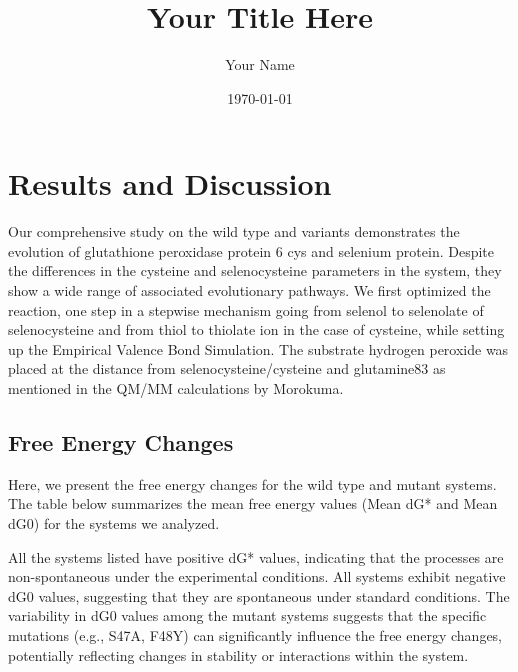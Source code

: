 \documentclass{article}
\begin{document}
\title{Your Title Here}
\author{Your Name}
\date{\today}
\maketitle

\section{Results and Discussion}

Our comprehensive study on the wild type and variants demonstrates the evolution of glutathione peroxidase protein 6 cys and selenium protein. 
Despite the differences in the cysteine and selenocysteine parameters in the system, they show a wide range of associated evolutionary pathways.
We first optimized the reaction, one step in a stepwise mechanism going from selenol to selenolate of selenocysteine and from thiol to thiolate ion in the case of cysteine, while setting up the Empirical Valence Bond Simulation.
The substrate hydrogen peroxide was placed at the distance from selenocysteine/cysteine and glutamine83 as mentioned in the QM/MM calculations by Morokuma.

\subsection{Free Energy Changes}

Here, we present the free energy changes for the wild type and mutant systems. The table below summarizes the mean free energy values (Mean dG* and Mean dG0) for the systems we analyzed.

All the systems listed have positive dG* values, indicating that the processes are non-spontaneous under the experimental conditions.
All systems exhibit negative dG0 values, suggesting that they are spontaneous under standard conditions.
The variability in dG0 values among the mutant systems suggests that the specific mutations (e.g., S47A, F48Y) can significantly influence the free energy changes, potentially reflecting changes in stability or interactions within the system.




\end{document}
